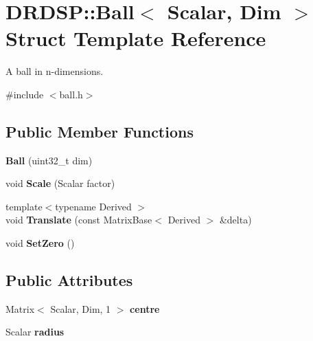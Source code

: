 \hypertarget{struct_d_r_d_s_p_1_1_ball}{\section{D\-R\-D\-S\-P\-:\-:Ball$<$ Scalar, Dim $>$ Struct Template Reference}
\label{struct_d_r_d_s_p_1_1_ball}
}


A ball in n-\/dimensions.  




{\ttfamily \#include $<$ball.\-h$>$}

\subsection*{Public Member Functions}
\begin{DoxyCompactItemize}
\item 
\hypertarget{struct_d_r_d_s_p_1_1_ball_a7325f73256ad91a2895b94e78795f51a}{{\bfseries Ball} (uint32\-\_\-t dim)}\label{struct_d_r_d_s_p_1_1_ball_a7325f73256ad91a2895b94e78795f51a}

\item 
\hypertarget{struct_d_r_d_s_p_1_1_ball_a501f0f001a66b1d9f94a8ea2d0f614a9}{void {\bfseries Scale} (Scalar factor)}\label{struct_d_r_d_s_p_1_1_ball_a501f0f001a66b1d9f94a8ea2d0f614a9}

\item 
\hypertarget{struct_d_r_d_s_p_1_1_ball_a6d212a3c6b40618ba967a43e21f5072e}{{\footnotesize template$<$typename Derived $>$ }\\void {\bfseries Translate} (const Matrix\-Base$<$ Derived $>$ \&delta)}\label{struct_d_r_d_s_p_1_1_ball_a6d212a3c6b40618ba967a43e21f5072e}

\item 
\hypertarget{struct_d_r_d_s_p_1_1_ball_a2554c10ef1630072d9811265ea42d319}{void {\bfseries Set\-Zero} ()}\label{struct_d_r_d_s_p_1_1_ball_a2554c10ef1630072d9811265ea42d319}

\end{DoxyCompactItemize}
\subsection*{Public Attributes}
\begin{DoxyCompactItemize}
\item 
\hypertarget{struct_d_r_d_s_p_1_1_ball_aeb7944483b29864671761f802674a790}{Matrix$<$ Scalar, Dim, 1 $>$ {\bfseries centre}}\label{struct_d_r_d_s_p_1_1_ball_aeb7944483b29864671761f802674a790}

\item 
\hypertarget{struct_d_r_d_s_p_1_1_ball_a1bfed04ab3674ab19428104779219934}{Scalar {\bfseries radius}}\label{struct_d_r_d_s_p_1_1_ball_a1bfed04ab3674ab19428104779219934}

\end{DoxyCompactItemize}


